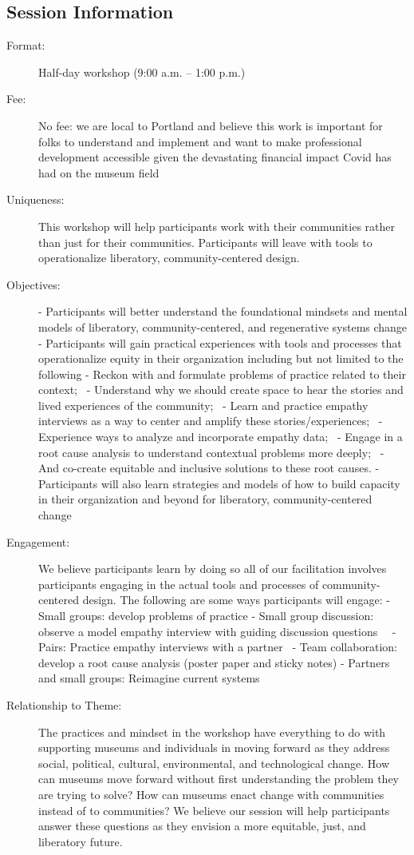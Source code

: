 \documentclass{report}
\begin{document}
              \subsection*{Session Information}
                \begin{description}
                  \item [Format:] Half-day workshop (9:00 a.m. – 1:00 p.m.)
							    
								  \item [Fee:]No fee: we are local to Portland and believe this work is important for folks to understand and implement and want to make professional development accessible given the devastating financial impact Covid has had on the museum field
							     
							    \item [Uniqueness:]This workshop will help participants work with their communities rather than just for their communities. Participants will leave with tools to operationalize liberatory, community-centered design.
							    \item [Objectives:]- Participants will better understand the foundational mindsets and mental models of liberatory, community-centered, and regenerative systems change
- Participants will gain practical experiences with tools and processes that operationalize equity in their organization including but not limited to the following
    - Reckon with and formulate problems of practice related to their context; 
    - Understand why we should create space to hear the stories and lived experiences of the community; 
    - Learn and practice empathy interviews as a way to center and amplify these stories/experiences; 
    - Experience ways to analyze and incorporate empathy data; 
    - Engage in a root cause analysis to understand contextual problems more deeply; 
    - And co-create equitable and inclusive solutions to these root causes.
- Participants will also learn strategies and models of how to build capacity  in their organization and beyond for liberatory, community-centered change
							    \item [Engagement:]We believe participants learn by doing so all of our facilitation involves participants engaging in the actual tools and processes of community-centered design. The following are some ways participants will engage:
- Small groups: develop problems of practice
- Small group discussion: observe a model empathy interview with guiding discussion questions  
- Pairs: Practice empathy interviews with a partner 
- Team collaboration: develop a root cause analysis (poster paper and sticky notes)
- Partners and small groups: Reimagine current systems
							    \item [Relationship to Theme:]The practices and mindset in the workshop have everything to do with supporting museums and individuals in moving forward as they address social, political, cultural, environmental, and technological change. How can museums move forward without first understanding the problem they are trying to solve? How can museums enact change with communities instead of to communities? We believe our session will help participants answer these questions as they envision a more equitable, just, and liberatory future.
							    

\end{description}
\end{document}
